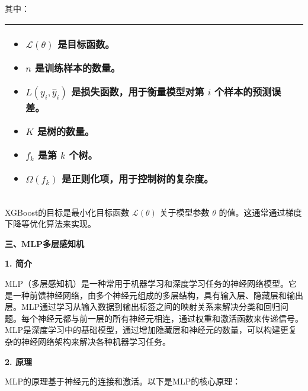 \documentclass[bwprint]{gmcmthesis}
\begin{document}
				其中：
				
				\begin{table}[H]
					\centering
					\begin{tabularx}{\textwidth}{|X|}
					\hline
					\begin{itemize}
						\item $\mathcal{L}(\theta)$ 是目标函数。
						\item $n$ 是训练样本的数量。
						\item $L(y_i, \hat{y}_i)$ 是损失函数，用于衡量模型对第 $i$ 个样本的预测误差。
						\item $K$ 是树的数量。
						\item $f_k$ 是第 $k$ 个树。
						\item $\Omega(f_k)$ 是正则化项，用于控制树的复杂度。
					\end{itemize}\\
					\hline
				\end{tabularx}
				\end{table}
				
				XGBoost的目标是最小化目标函数 $\mathcal{L}(\theta)$ 关于模型参数 $\theta$ 的值。这通常通过梯度下降等优化算法来实现。
				
				\textbf{三、MLP多层感知机}
				
				\textbf{1. 简介}
				
				MLP（多层感知机）是一种常用于机器学习和深度学习任务的神经网络模型。它是一种前馈神经网络，由多个神经元组成的多层结构，具有输入层、隐藏层和输出层。MLP通过学习从输入数据到输出标签之间的映射关系来解决分类和回归问题。每个神经元都与前一层的所有神经元相连，通过权重和激活函数来传递信号。MLP是深度学习中的基础模型，通过增加隐藏层和神经元的数量，可以构建更复杂的神经网络架构来解决各种机器学习任务。
				
				\textbf{2. 原理}
				
				MLP的原理基于神经元的连接和激活。以下是MLP的核心原理：
				
\end{document}
